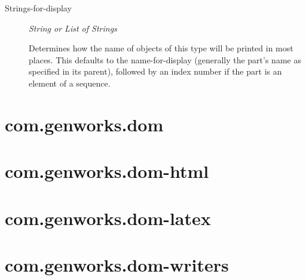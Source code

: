 \documentclass [11pt]{book}
\begin{document}
\begin{itemize}
\begin{description}

\item [Strings-for-display]
\emph{String or List of Strings}

 Determines how the name of objects of
this type will be printed in most places.  This defaults to the
name-for-display (generally the part's name as specified in its
parent), followed by an index number if the part is an element of a
sequence.




\end{description}







\end{itemize}





\section{com.genworks.dom }

\label{sec:com.genworks.dom}







\section{com.genworks.dom-html }

\label{sec:com.genworks.dom-html}







\section{com.genworks.dom-latex }

\label{sec:com.genworks.dom-latex}







\section{com.genworks.dom-writers }

\label{sec:com.genworks.dom-writers}
\end{document}
